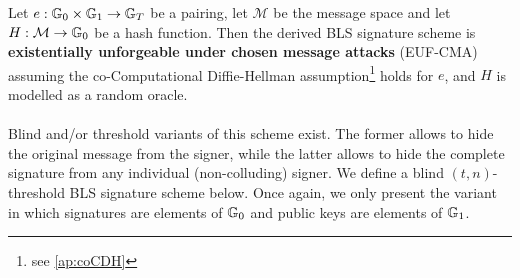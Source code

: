 \begin{theorem} \label{th:blsforge}
	Let $e : \mathbb{G}_0 \times \mathbb{G}_1 \rightarrow \mathbb{G}_T$ be a pairing, let $\mathcal{M}$ be the message space and let $H: \mathcal{M} \rightarrow \mathbb{G}_0$ be a hash function. Then the derived BLS signature scheme is \textbf{existentially unforgeable under chosen message attacks} (EUF-CMA) assuming the co-Computational Diffie-Hellman assumption\footnote{see \autoref{ap:coCDH}} holds for $e$, and $H$ is modelled as a random oracle.
\end{theorem} 

\paragraph{} Blind and/or threshold variants of this scheme exist. The former allows to hide the original message from the signer, while the latter allows to hide the complete signature from any individual (non-colluding) signer. We define a blind $(t,n)$-threshold BLS signature scheme below. Once again, we only present the variant in which signatures are elements of $\mathbb{G}_0$ and public keys are elements of $\mathbb{G}_1$. 

